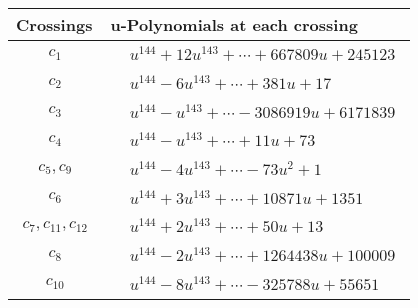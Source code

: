 \documentclass[1p]{elsarticle_modified}
\theoremstyle{definition}
\begin{document}
\begin{tabular}{m{50pt}|m{274pt}}
Crossings & \hspace{64pt}u-Polynomials at each crossing \\
\hline $$\begin{aligned}c_{1}\end{aligned}$$&$\begin{aligned}
&u^{144}+12 u^{143}+\cdots+667809 u+245123
\end{aligned}$\\
\hline $$\begin{aligned}c_{2}\end{aligned}$$&$\begin{aligned}
&u^{144}-6 u^{143}+\cdots+381 u+17
\end{aligned}$\\
\hline $$\begin{aligned}c_{3}\end{aligned}$$&$\begin{aligned}
&u^{144}- u^{143}+\cdots-3086919 u+6171839
\end{aligned}$\\
\hline $$\begin{aligned}c_{4}\end{aligned}$$&$\begin{aligned}
&u^{144}- u^{143}+\cdots+11 u+73
\end{aligned}$\\
\hline $$\begin{aligned}c_{5},c_{9}\end{aligned}$$&$\begin{aligned}
&u^{144}-4 u^{143}+\cdots-73 u^2+1
\end{aligned}$\\
\hline $$\begin{aligned}c_{6}\end{aligned}$$&$\begin{aligned}
&u^{144}+3 u^{143}+\cdots+10871 u+1351
\end{aligned}$\\
\hline $$\begin{aligned}c_{7},c_{11},c_{12}\end{aligned}$$&$\begin{aligned}
&u^{144}+2 u^{143}+\cdots+50 u+13
\end{aligned}$\\
\hline $$\begin{aligned}c_{8}\end{aligned}$$&$\begin{aligned}
&u^{144}-2 u^{143}+\cdots+1264438 u+100009
\end{aligned}$\\
\hline $$\begin{aligned}c_{10}\end{aligned}$$&$\begin{aligned}
&u^{144}-8 u^{143}+\cdots-325788 u+55651
\end{aligned}$\\
\hline
\end{tabular}\\~\\
\end{document}

